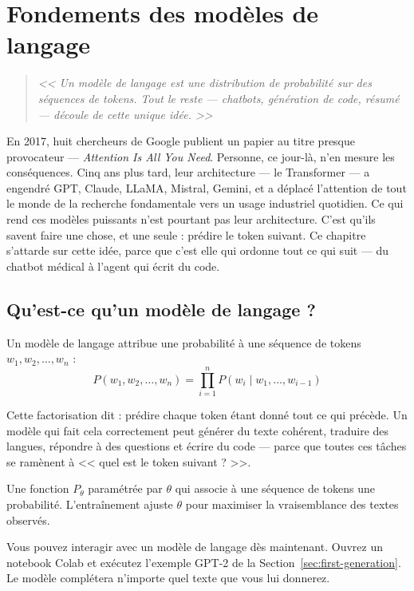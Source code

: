 \chapter{Fondements des mod\`eles de langage}
\label{ch:foundations}

\begin{quote}
\emph{<< Un mod\`ele de langage est une distribution de probabilit\'e sur des s\'equences de tokens. Tout le reste --- chatbots, g\'en\'eration de code, r\'esum\'e --- d\'ecoule de cette unique id\'ee. >>}
\end{quote}

En 2017, huit chercheurs de Google publient un papier au titre presque provocateur --- \emph{Attention Is All You Need}. Personne, ce jour-là, n'en mesure les conséquences. Cinq ans plus tard, leur architecture --- le Transformer --- a engendré GPT, Claude, LLaMA, Mistral, Gemini, et a déplacé l'attention de tout le monde de la recherche fondamentale vers un usage industriel quotidien. Ce qui rend ces modèles puissants n'est pourtant pas leur architecture. C'est qu'ils savent faire une chose, et une seule : prédire le token suivant. Ce chapitre s'attarde sur cette idée, parce que c'est elle qui ordonne tout ce qui suit --- du chatbot médical à l'agent qui écrit du code.
\section{Qu'est-ce qu'un mod\`ele de langage ?}

Un mod\`ele de langage attribue une probabilit\'e \`a une s\'equence de tokens $w_1, w_2, \ldots, w_n$ :
\[
P(w_1, w_2, \ldots, w_n) = \prod_{i=1}^{n} P(w_i \mid w_1, \ldots, w_{i-1})
\]

Cette factorisation dit : pr\'edire chaque token \'etant donn\'e tout ce qui pr\'ec\`ede. Un mod\`ele qui fait cela correctement peut g\'en\'erer du texte coh\'erent, traduire des langues, r\'epondre \`a des questions et \'ecrire du code --- parce que toutes ces t\^aches se ram\`enent \`a << quel est le token suivant ? >>.

\begin{definition}
Une fonction $P_\theta$ param\'etr\'ee par $\theta$ qui associe \`a une s\'equence de tokens une probabilit\'e. L'entra\^inement ajuste $\theta$ pour maximiser la vraisemblance des textes observ\'es.
\end{definition}

\begin{aitip}
Vous pouvez interagir avec un mod\`ele de langage d\`es maintenant. Ouvrez un notebook Colab et ex\'ecutez l'exemple GPT-2 de la Section~\ref{sec:first-generation}. Le mod\`ele compl\'etera n'importe quel texte que vous lui donnerez.
\end{aitip}

